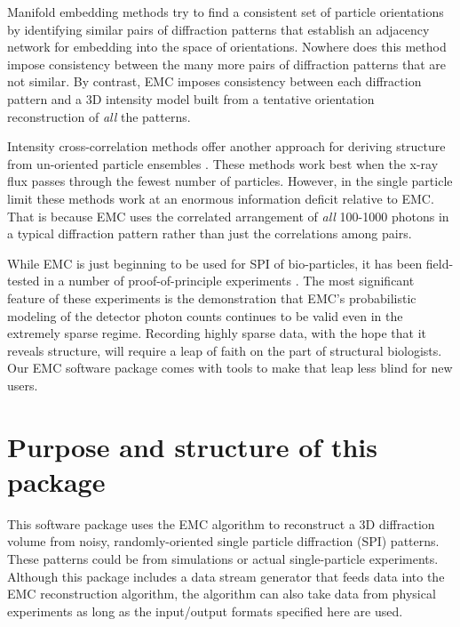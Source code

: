\documentclass[]{iucr}              %
\begin{document}
Manifold embedding methods \cite{Schwander2012} try to find a consistent set of particle orientations by identifying similar pairs of diffraction patterns that establish an adjacency network for embedding into the space of orientations. Nowhere does this method impose consistency between the many more pairs of diffraction patterns that are not similar. By contrast, EMC imposes consistency between each diffraction pattern and a 3D intensity model built from a tentative orientation reconstruction of \textit{all} the patterns.

Intensity cross-correlation methods offer another approach for deriving structure from un-oriented particle ensembles \cite{Kam1977, Saldin2010}. These methods work best when the x-ray flux passes through the fewest number of particles. However, in the single particle limit these methods work at an enormous information deficit relative to EMC. That is because EMC uses the correlated arrangement of \textit{all} 100-1000 photons in a typical diffraction pattern rather than just the correlations among pairs.

While EMC is just beginning to be used for SPI of bio-particles, it has been field-tested in a number of proof-of-principle experiments \cite{philipp2012,ayyer2014,wierman2016}. The most significant feature of these experiments is the demonstration that EMC's probabilistic modeling of the detector photon counts continues to be valid even in the extremely sparse regime. Recording highly sparse data, with the hope that it reveals structure, will require a leap of faith on the part of structural biologists. Our EMC software package comes with tools to make that leap less blind for new users.


\section{Purpose and structure of this package}\label{sec:package}

This software package uses the EMC algorithm to reconstruct a 3D diffraction volume from noisy, randomly-oriented single particle diffraction (SPI) patterns. These patterns could be from simulations or actual single-particle experiments. Although this package includes a data stream generator that feeds data into the EMC reconstruction algorithm, the algorithm can also take data from physical experiments as long as the input/output formats specified here are used.
\end{document}
